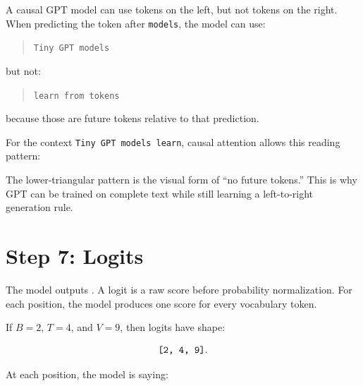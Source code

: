 A causal GPT model can use tokens on the left, but not tokens on the right. When predicting the token after \texttt{models}, the model can use:

\begin{quote}
\texttt{Tiny GPT models}
\end{quote}

but not:

\begin{quote}
\texttt{learn from tokens}
\end{quote}

because those are future tokens relative to that prediction.

For the context \texttt{Tiny GPT models learn}, causal attention allows this reading pattern:

\begin{center}
\end{center}

The lower-triangular pattern is the visual form of ``no future tokens.'' This is why GPT can be trained on complete text while still learning a left-to-right generation rule.

\section{Step 7: Logits}

The model outputs . A logit is a raw score before probability normalization. For each position, the model produces one score for every vocabulary token.

If \(B=2\), \(T=4\), and \(V=9\), then logits have shape:

\[
\texttt{[2, 4, 9]}.
\]

At each position, the model is saying:


